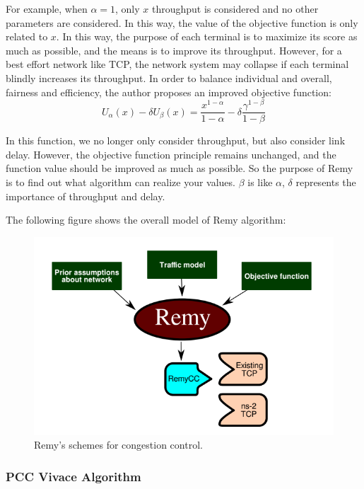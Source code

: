 \documentclass[conference]{IEEEtran}
\begin{document}
\begin{enumerate}
    \quad For example, when $\alpha=1$, only $x$ throughput is considered and no other parameters are considered. In this way, the value of the objective function is only related to $x$. In this way, the purpose of each terminal is to maximize its score as much as possible, and the means is to improve its throughput. However, for a best effort network like TCP, the network system may collapse if each terminal blindly increases its throughput. In order to balance individual and overall, fairness and efficiency, the author proposes an improved objective function:
    \begin{equation}
        U_\alpha(x)-\delta U_\beta(x)=\frac{x^{1-\alpha}}{1-\alpha}-\delta\frac{\gamma^{1-\beta}}{1-\beta}
    \end{equation}
    
    \quad In this function, we no longer only consider throughput, but also consider link delay. However, the objective function principle remains unchanged, and the function value should be improved as much as possible. So the purpose of Remy is to find out what algorithm can realize your values. $\beta$ is like $\alpha$, $\delta$ represents the importance of throughput and delay.

    \quad The following figure shows the overall model of Remy algorithm:
    \begin{figure}[!h]
    \centerline{\includegraphics[scale=0.25]{picture/figure3-2.png}}
    \caption{Remy's schemes for congestion control.\cite{a5}}
    \label{fig3-2}
    \end{figure}   
\end{enumerate}

\subsubsection{PCC Vivace Algorithm}\quad
\end{document}
